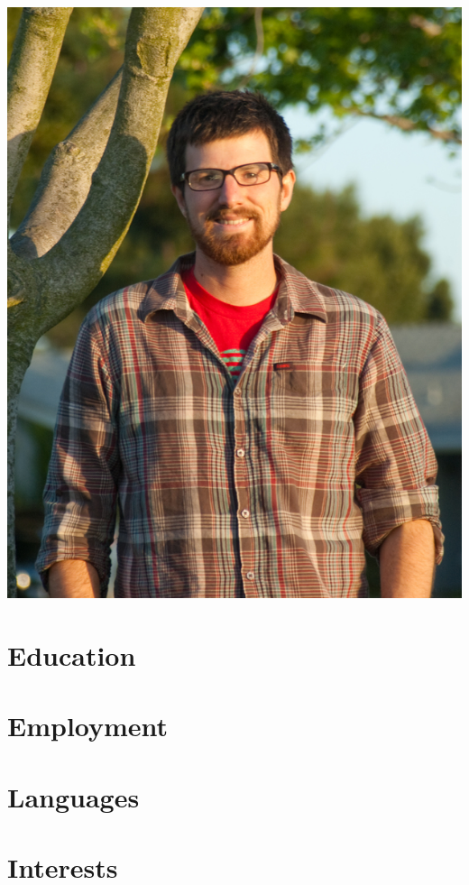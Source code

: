 



\thispagestyle{firstpagestyle}
\pagestyle{fancy}

\begin{center}
\vspace{10px}{\Large Patrick Sanan}\\
\end{center}
\vspace{10px}
\begin{minipage}{0.8\textwidth}

\end{minipage}
\begin{minipage}{0.19\textwidth}
  \includegraphics[width=\textwidth]{sanan_patrick_portrait_small.jpg}
\end{minipage}

\section*{Education}


\section*{Employment}


\section*{Languages}


\section*{Interests}


\thispagestyle{lastpagestyle}


